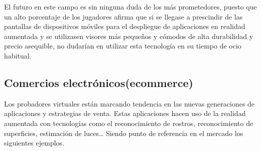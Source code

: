 El futuro en este campo es sin ninguna duda de los más prometedores, puesto que un alto porcentaje de los jugadores afirma que si se llegase a prescindir de las pantallas de dispositivos móviles para el despliegue de aplicaciones en realidad aumentada y se utilizasen visores más pequeños y cómodos de alta durabilidad y precio asequible, no dudarían en utilizar esta tecnología en su tiempo de ocio habitual.

\subsection{Comercios electrónicos(ecommerce)}
Los probadores virtuales están marcando tendencia en las nuevas generaciones de aplicaciones y estrategias de venta. Estas aplicaciones hacen uso de la realidad aumentada con tecnologías como el reconocimiento de rostros, reconocimiento de superficies, estimación de luces… Siendo punto de referencia en el mercado los siguientes ejemplos. 
